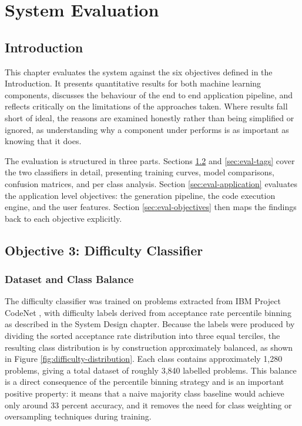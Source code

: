 \chapter{System Evaluation}

\section{Introduction}

This chapter evaluates the system against the six objectives defined in
the Introduction. It presents quantitative results for both machine
learning components, discusses the behaviour of the end to end
application pipeline, and reflects critically on the limitations of the
approaches taken. Where results fall short of ideal, the reasons are examined honestly rather than being simplified or ignored, as understanding why a
component under performs is as important as knowing that it does.

The evaluation is structured in three parts. Sections
\ref{sec:eval-difficulty} and \ref{sec:eval-tags} cover the two
classifiers in detail, presenting training curves, model comparisons,
confusion matrices, and per class analysis. Section
\ref{sec:eval-application} evaluates the application level objectives:
the generation pipeline, the code execution engine, and the user
features. Section \ref{sec:eval-objectives} then maps the findings back
to each objective explicitly.

\section{Objective 3: Difficulty Classifier}
\label{sec:eval-difficulty}

\subsection{Dataset and Class Balance}

The difficulty classifier was trained on problems extracted from IBM
Project CodeNet \cite{puri2021codenet}, with difficulty labels derived
from acceptance rate percentile binning as described in the System
Design chapter. Because the labels were produced by dividing the sorted
acceptance rate distribution into three equal terciles, the resulting
class distribution is by construction approximately balanced, as shown
in Figure \ref{fig:difficulty-distribution}. Each class contains
approximately 1,280 problems, giving a total dataset of roughly 3,840
labelled problems. This balance is a direct consequence of the
percentile binning strategy and is an important positive property: it
means that a naive majority class baseline would achieve only around 33
percent accuracy, and it removes the need for class weighting or
oversampling techniques \cite{chawla2002smote} during training.

